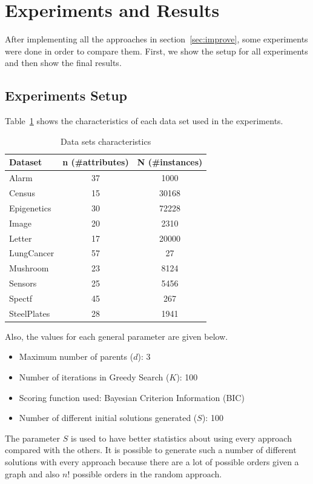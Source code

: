 \section{Experiments and Results}
\label{sec:experiments}

After implementing all the approaches in section~\ref{sec:improve}, some experiments were done in order to compare them. First, we show the setup for all experiments and then show the final results.

\subsection{Experiments Setup}
\label{subsec:configuration}
	Table~\ref{tab:datasets} shows the characteristics of each data set used in the experiments.
	\begin{table}[ h ]
		\centering
		\begin{tabular}{ | l | c | c | }
			\hline
			Dataset & n (\#attributes) & N (\#instances) \\ \hline
			Alarm & 37 & 1000 \\ \hline
			Census & 15 & 30168 \\ \hline
			Epigenetics & 30 & 72228 \\ \hline
			Image & 20 & 2310 \\ \hline
			Letter & 17 & 20000 \\ \hline
			LungCancer & 57 & 27 \\ \hline
			Mushroom & 23 & 8124 \\ \hline
			Sensors & 25 & 5456 \\ \hline
			Spectf & 45 & 267 \\ \hline
			SteelPlates & 28 & 1941 \\ \hline
		\end{tabular}
		\caption{Data sets characteristics}
		\label{tab:datasets}
	\end{table}
	Also, the values for each general parameter are given below.
	\begin{itemize}
		\item Maximum number of parents ($d$): 3
		\item Number of iterations in Greedy Search ($K$): 100
		\item Scoring function used: Bayesian Criterion Information (BIC)
		\item Number of different initial solutions generated ($S$): 100
	\end{itemize}
	The parameter $S$ is used to have better statistics about using every approach compared with the others. It is possible to generate such a number of different solutions with every approach because there are a lot of possible orders given a graph and also $n!$ possible orders in the random approach.

